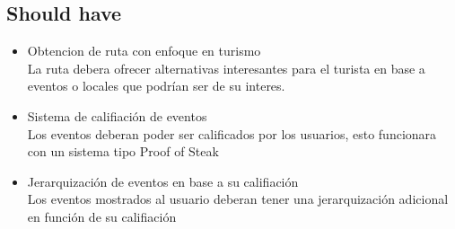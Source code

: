 \documentclass[a4paper,12pt,oneside]{article}
\begin{document}
\subsection{Should have}
  \begin{itemize}
    \item Obtencion de ruta con enfoque en turismo \\
      La ruta debera ofrecer alternativas interesantes para el turista en base a eventos o locales que podrían ser de su interes.
    \item Sistema de califiación de eventos \\
      Los eventos deberan poder ser calificados por los usuarios, esto funcionara con un sistema tipo Proof of Steak
    \item Jerarquización de eventos en base a su califiación \\
      Los eventos mostrados al usuario deberan tener una jerarquización adicional en función de su califiación
  \end{itemize}

\printbibliography[title={Bibliography}]
\end{document}
